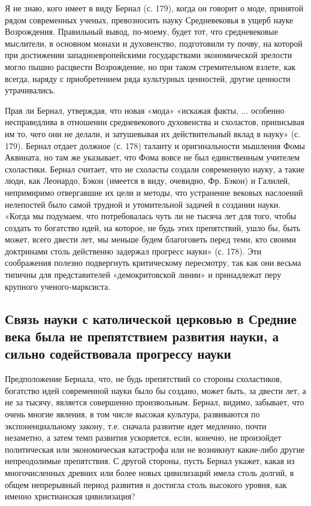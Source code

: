 Я не знаю, кого имеет в виду Бернал (с. 179), когда он говорит о моде,
принятой рядом современных ученых, превозносить науку Средневековья в
ущерб науке Возрождения. Правильный вывод, по-моему, будет тот, что
средневековые мыслители, в основном монахи и духовенство, подготовили
ту почву, на которой при достижении западноевропейскими государствами
экономической зрелости могло пышно расцвести Возрождение, но при таком
стремительном взлете, как всегда, наряду с приобретением ряда
культурных ценностей, другие ценности утрачивались.

Прав ли Бернал, утверждая, что новая «мода» «искажая факты, ...
особенно несправедлива в отношении средневекового духовенства и
схоластов, приписывая им то, чего они не делали, и затушевывая их
действительный вклад в науку» (с. 179). Бернал отдает должное (с. 178)
таланту и оригинальности мышления Фомы Аквината, но там же указывает,
что Фома вовсе не был единственным учителем схоластики. Бернал
считает, что не схоласты создали современную науку, а такие люди, как
Леонардо, Бэкон (имеется в виду, очевидно, Фр. Бэкон) и Галилей,
непримиримо отвергавшие их цели и методы, что устранение вековых
наслоений нелепостей было самой трудной и утомительной задачей в
создании науки. «Когда мы подумаем, что потребовалась чуть ли не
тысяча лет для того, чтобы создать то богатство идей, на которое, не
будь этих препятствий, ушло бы, быть может, всего двести лет, мы
меньше будем благоговеть перед теми, кто своими доктринами столь
действенно задержал прогресс науки» (с. 178). Эти соображения полезно
подвергнуть критическому пересмотру, так как они весьма типичны для
представителей «демокритовской линии» и принадлежат перу крупного
ученого-марксиста.

\subsection{Связь науки с католической церковью в Средние века была не
препятствием развития науки, а сильно содействовала прогрессу науки}

Предположение Бернала, что, не будь препятствий со стороны
схоластиков, богатство идей современной науки было бы создано, может
быть, за двести лет, а не за тысячу, является совершенно произвольным.
Бернал, видимо, забывает, что очень многие явления, в том числе
высокая культура, развиваются по экспоненциальному закону, т.е.
сначала развитие идет медленно, почти незаметно, а затем темп развития
ускоряется, если, конечно, не произойдет политическая или
экономическая катастрофа или не возникнут какие-либо другие
непреодолимые препятствия. С другой стороны, пусть Бернал укажет,
какая из многочисленных древних или более новых цивилизаций имела
столь долгий, в общем непрерывный период развития и достигла столь
высокого уровня, как именно христианская цивилизация?

